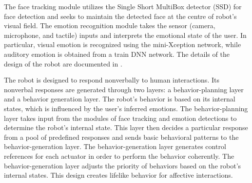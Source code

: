 \documentclass[letterpaper, 10 pt, conference]{ieeeconf}  %
\begin{document}
The face tracking module utilizes the Single Short MultiBox detector (SSD) for face detection and seeks to maintain the detected face at the centre of robot's visual field. The emotion recognition module takes the sensor (camera, microphone, and tactile) inputs and interprets the emotional state of the user. In particular, visual emotion is recognized using the mini-Xception network, while auditory emotion is obtained from a train DNN network. The details of the design of the robot are documented in \cite{r4}. 

The robot is designed to respond nonverbally to human interactions. Its nonverbal responses are generated through two layers: a behavior-planning layer and a behavior generation layer. The robot's behavior is based on its internal states, which is influenced by the user's inferred emotions. The behavior-planning layer takes input from the modules of face tracking and emotion detections to determine the robot's internal state. This layer then decides a particular response from a pool of predefined responses and sends basic behavioral patterns to the behavior-generation layer. The behavior-generation layer generates control references for each actuator in order to perform the behavior coherently. The behavior-generation layer adjusts the priority of behaviors based on the robot's internal states. This design creates lifelike behavior for affective interactions.



\end{document}
